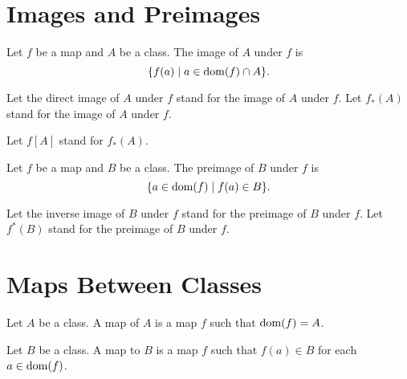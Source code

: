 \documentclass[10pt]{article}
\begin{document}
  \section{Images and Preimages}

  \begin{forthel}
    \begin{definition}
      Let $f$ be a map and $A$ be a class.
      The image of $A$ under $f$ is
      \[ \{ f(a) \mid a \in \operatorname{dom}(f) \cap A \}. \]
    \end{definition}

    Let the direct image of $A$ under $f$ stand for the image of $A$ under $f$.
    Let $f_{*}(A)$ stand for the image of $A$ under $f$.

    Let $f[A]$ stand for $f_{*}(A)$.
  \end{forthel}

  \begin{forthel}
    \begin{definition}
      Let $f$ be a map and $B$ be a class.
      The preimage of $B$ under $f$ is
      \[ \{ a \in \operatorname{dom}(f) \mid f(a) \in B \}. \]
    \end{definition}

    Let the inverse image of $B$ under $f$ stand for the preimage of $B$ under
    $f$.
    Let $f^{*}(B)$ stand for the preimage of $B$ under $f$.
  \end{forthel}


  \section{Maps Between Classes}

  \begin{forthel}
    \begin{definition}
      Let $A$ be a class.
      A map of $A$ is a map $f$ such that $\operatorname{dom}(f) = A$.
    \end{definition}
  \end{forthel}

  \begin{forthel}
    \begin{definition}
      Let $B$ be a class.
      A map to $B$ is a map $f$ such that $f(a) \in B$ for each $a \in \operatorname{dom}(f)$.
    \end{definition}
  \end{forthel}
\end{document}
